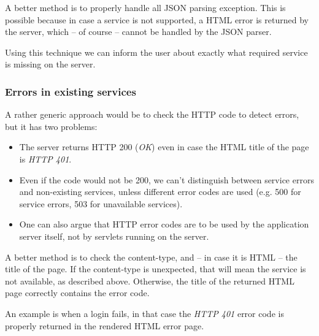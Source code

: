 A better method is to properly handle all JSON parsing exception. This is
possible because in case a service is not supported, a HTML error is returned
by the server, which -- of course -- cannot be handled by the JSON parser.

Using this technique we can inform the user about exactly what required service
is missing on the server.

\subsubsection*{Errors in existing services}

A rather generic approach would be to check the HTTP code to detect errors, but it has two problems:

\begin{itemize}
\item The server returns HTTP 200 (\emph{OK}) even in case the HTML title of the page is \emph{HTTP 401}.
\item Even if the code would not be 200, we can't distinguish between service errors and non-existing services, unless different error codes are used (e.g. 500 for service errors, 503 for unavailable services).
\item One can also argue that HTTP error codes are to be used by the application server itself, not by servlets running on the server.
\end{itemize}

A better method is to check the content-type, and -- in case it is HTML -- the
title of the page.  If the content-type is unexpected, that will mean the
service is not available, as described above. Otherwise, the title of the
returned HTML page correctly contains the error code.

An example is when a login fails, in that case the \emph{HTTP 401} error code
is properly returned in the rendered HTML error page.

